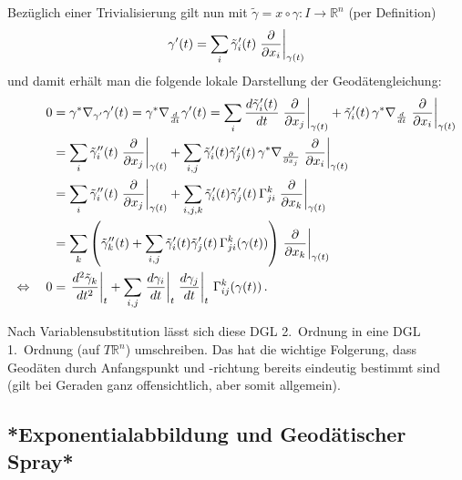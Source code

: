\documentclass[../H_Analysis_main.tex]{subfiles}
\begin{document}
Bezüglich einer Trivialisierung gilt nun mit $\tilde{\gamma} = x \circ \gamma: I \rightarrow \mathbb{R}^n$ (per Definition)
\begin{equation*}
\gamma'(t) = \sum_i \tilde{\gamma}_i'(t) \eval{\pdv{x_i}}_{\gamma(t)}
\end{equation*}
und damit erhält man die folgende lokale Darstellung der Geodätengleichung:
\begin{align}
0 &= \gamma^* \nabla_{\gamma'} \gamma'(t) = \gamma^* \nabla_{\dv{t}} \gamma'(t) = \sum_i \dv{\tilde{\gamma}_i'(t)}{t} \eval{\pdv{x_j}}_{\gamma(t)} + \tilde{\gamma}_i'(t) \, \gamma^* \nabla_{\dv{t}} \eval{\pdv{x_i}}_{\gamma(t)}
\notag\\
&= \sum_i \tilde{\gamma}_i''(t) \eval{\pdv{x_j}}_{\gamma(t)} + \sum_{i, j} \tilde{\gamma}_i'(t) \tilde{\gamma}_j'(t) \, \gamma^* \nabla_{\pdv{x_j}} \eval{\pdv{x_i}}_{\gamma(t)}
\notag\\
&= \sum_i \tilde{\gamma}_i''(t) \eval{\pdv{x_j}}_{\gamma(t)} + \sum_{i, j, k} \tilde{\gamma}_i'(t) \tilde{\gamma}_j'(t) \, \Gamma_{ji}^k \eval{\pdv{x_k}}_{\gamma(t)}
\notag\\
&= \sum_k \qty(\tilde{\gamma}_k''(t) + \sum_{i, j} \tilde{\gamma}_i'(t) \tilde{\gamma}_j'(t) \, \Gamma_{ji}^k(\gamma(t))) \eval{\pdv{x_k}}_{\gamma(t)}
\notag\\
\Leftrightarrow \quad 0 &= \eval{\dv[2]{\tilde{\gamma}_k}{t}}_t + \sum_{i, j} \eval{\dv{\gamma_i}{t}}_t \eval{\dv{\gamma_j}{t}}_t \, \Gamma_{ij}^k(\gamma(t)) \, .
\end{align}

Nach Variablensubstitution lässt sich diese DGL 2.~Ordnung in eine DGL 1.~Ordnung (auf $T \mathbb{R}^n$) umschreiben. Das hat die wichtige Folgerung, dass Geodäten durch Anfangspunkt und -richtung bereits eindeutig bestimmt sind (gilt bei Geraden ganz offensichtlich, aber somit allgemein).\\



		\subsection{*Exponentialabbildung und Geodätischer Spray*}

\end{document}
